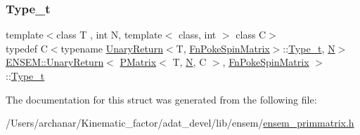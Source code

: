 \mbox{\label{structENSEM_1_1UnaryReturn_3_01PMatrix_3_01T_00_01N_00_01C_01_4_00_01FnPokeSpinMatrix_01_4_abbbfcc8a97ca25a57a700734961be247}} 
\subsubsection{\texorpdfstring{Type\_t}{Type\_t}\hspace{0.1cm}{\footnotesize\ttfamily [2/2]}}
{\footnotesize\ttfamily template$<$class T , int N, template$<$ class, int $>$ class C$>$ \\
typedef C$<$typename \mbox{\hyperlink{structENSEM_1_1UnaryReturn}{Unary\+Return}}$<$T, \mbox{\hyperlink{structENSEM_1_1FnPokeSpinMatrix}{Fn\+Poke\+Spin\+Matrix}}$>$\+::\mbox{\hyperlink{structENSEM_1_1UnaryReturn_3_01PMatrix_3_01T_00_01N_00_01C_01_4_00_01FnPokeSpinMatrix_01_4_abbbfcc8a97ca25a57a700734961be247}{Type\+\_\+t}}, \mbox{\hyperlink{operator__name__util_8cc_a7722c8ecbb62d99aee7ce68b1752f337}{N}}$>$ \mbox{\hyperlink{structENSEM_1_1UnaryReturn}{E\+N\+S\+E\+M\+::\+Unary\+Return}}$<$ \mbox{\hyperlink{classENSEM_1_1PMatrix}{P\+Matrix}}$<$ T, \mbox{\hyperlink{operator__name__util_8cc_a7722c8ecbb62d99aee7ce68b1752f337}{N}}, C $>$, \mbox{\hyperlink{structENSEM_1_1FnPokeSpinMatrix}{Fn\+Poke\+Spin\+Matrix}} $>$\+::\mbox{\hyperlink{structENSEM_1_1UnaryReturn_3_01PMatrix_3_01T_00_01N_00_01C_01_4_00_01FnPokeSpinMatrix_01_4_abbbfcc8a97ca25a57a700734961be247}{Type\+\_\+t}}}



The documentation for this struct was generated from the following file\+:\begin{DoxyCompactItemize}
\item 
/\+Users/archanar/\+Kinematic\+\_\+factor/adat\+\_\+devel/lib/ensem/\mbox{\hyperlink{lib_2ensem_2ensem__primmatrix_8h}{ensem\+\_\+primmatrix.\+h}}\end{DoxyCompactItemize}
